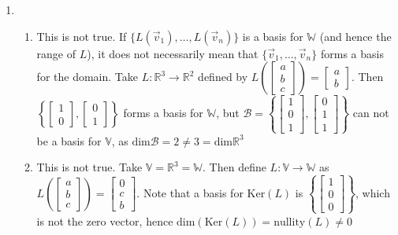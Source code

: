\documentclass[10pt,english]{article}
\begin{document}
\begin{enumerate}
\pagebreak
\item \begin{enumerate}
    \item This is not true. If $\{L(\vec{v}_1),\ldots,L(\vec{v}_n)\}$ is a basis for $\mathbb{W}$ (and hence the range of $L$), it does not necessarily mean that $\{\vec{v}_1,\ldots,\vec{v}_n\}$ forms a basis for the domain. Take $L:\mathbb{R}^3\rightarrow\mathbb{R}^2$ defined by $L\left(\begin{bmatrix}a\\b\\c\end{bmatrix}\right)=\begin{bmatrix}a\\b\end{bmatrix}$. Then $\left\{\begin{bmatrix}1\\0\end{bmatrix},\begin{bmatrix}0\\1\end{bmatrix}\right\}$ forms a basis for $\mathbb{W}$, but $\mathcal{B}=\left\{\begin{bmatrix}1\\0\\1\end{bmatrix},\begin{bmatrix}0\\1\\1\end{bmatrix}\right\}$ can not be a basis for $\mathbb{V}$, as $\text{dim}\mathcal{B}=2\neq3=\text{dim}\mathbb{R}^3$
    
    \item This is not true. Take $\mathbb{V}=\mathbb{R}^3=\mathbb{W}$. Then define $L:\mathbb{V}\rightarrow\mathbb{W}$ as $L\left(\begin{bmatrix}a\\b\\c\end{bmatrix}\right)=\begin{bmatrix}0\\c\\b\end{bmatrix}$. Note that a basis for Ker$(L)$ is $\left\{\begin{bmatrix}1\\0\\0\end{bmatrix}\right\}$, which is not the zero vector, hence $\text{dim}(\text{Ker}(L))=\text{nullity}(L)\neq0$
    

\end{enumerate}
\end{enumerate}
\end{document}
